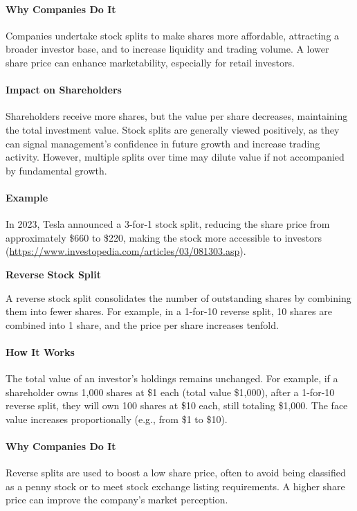 \documentclass[12pt]{article}
\begin{document}
\paragraph{Why Companies Do It}
Companies undertake stock splits to make shares more affordable, attracting a broader investor base, and to increase liquidity and trading volume. A lower share price can enhance marketability, especially for retail investors.

\paragraph{Impact on Shareholders}
Shareholders receive more shares, but the value per share decreases, maintaining the total investment value. Stock splits are generally viewed positively, as they can signal management's confidence in future growth and increase trading activity. However, multiple splits over time may dilute value if not accompanied by fundamental growth.

\paragraph{Example}
In 2023, Tesla announced a 3-for-1 stock split, reducing the share price from approximately \$660 to \$220, making the stock more accessible to investors (\url{https://www.investopedia.com/articles/03/081303.asp}).

\textbf{Reverse Stock Split}

A reverse stock split consolidates the number of outstanding shares by combining them into fewer shares. For example, in a 1-for-10 reverse split, 10 shares are combined into 1 share, and the price per share increases tenfold.

\paragraph{How It Works}
The total value of an investor's holdings remains unchanged. For example, if a shareholder owns 1,000 shares at \$1 each (total value \$1,000), after a 1-for-10 reverse split, they will own 100 shares at \$10 each, still totaling \$1,000. The face value increases proportionally (e.g., from \$1 to \$10).

\paragraph{Why Companies Do It}
Reverse splits are used to boost a low share price, often to avoid being classified as a penny stock or to meet stock exchange listing requirements. A higher share price can improve the company's market perception.
\end{document}
